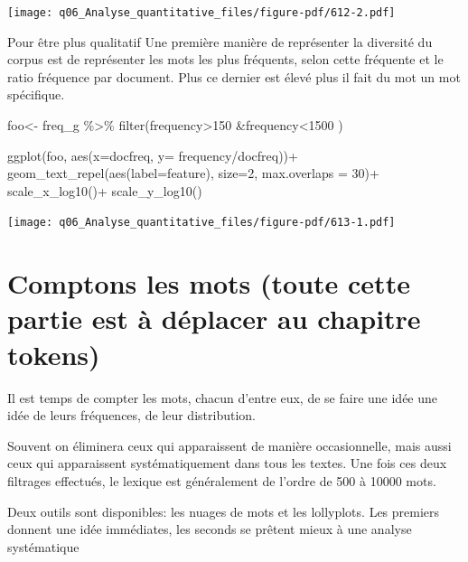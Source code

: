 \documentclass[
  letterpaper,
  DIV=11,
  numbers=noendperiod]{scrreprt}
\newenvironment{Shaded}{\begin{snugshade}}{\end{snugshade}}
\newcommand{\AttributeTok}[1]{\textcolor[rgb]{0.40,0.45,0.13}{#1}}
\newcommand{\DecValTok}[1]{\textcolor[rgb]{0.68,0.00,0.00}{#1}}
\newcommand{\FunctionTok}[1]{\textcolor[rgb]{0.28,0.35,0.67}{#1}}
\newcommand{\NormalTok}[1]{\textcolor[rgb]{0.00,0.23,0.31}{#1}}
\newcommand{\OtherTok}[1]{\textcolor[rgb]{0.00,0.23,0.31}{#1}}
\newcommand{\SpecialCharTok}[1]{\textcolor[rgb]{0.37,0.37,0.37}{#1}}
\begin{document}
\texttt{[image: q06\_Analyse\_quantitative\_files/figure-pdf/612-2.pdf]}

Pour être plus qualitatif Une première manière de représenter la
diversité du corpus est de représenter les mots les plus fréquents,
selon cette fréquente et le ratio fréquence par document. Plus ce
dernier est élevé plus il fait du mot un mot spécifique.

\begin{Shaded}
\begin{Highlighting}[]
\NormalTok{foo}\OtherTok{\textless{}{-}}\NormalTok{ freq\_g }\SpecialCharTok{\%\textgreater{}\%}
  \FunctionTok{filter}\NormalTok{(frequency}\SpecialCharTok{\textgreater{}}\DecValTok{150} \SpecialCharTok{\&}\NormalTok{frequency}\SpecialCharTok{\textless{}}\DecValTok{1500}\NormalTok{ )}

\FunctionTok{ggplot}\NormalTok{(foo, }\FunctionTok{aes}\NormalTok{(}\AttributeTok{x=}\NormalTok{docfreq, }\AttributeTok{y=}\NormalTok{ frequency}\SpecialCharTok{/}\NormalTok{docfreq))}\SpecialCharTok{+}
  \FunctionTok{geom\_text\_repel}\NormalTok{(}\FunctionTok{aes}\NormalTok{(}\AttributeTok{label=}\NormalTok{feature), }\AttributeTok{size=}\DecValTok{2}\NormalTok{, }\AttributeTok{max.overlaps =} \DecValTok{30}\NormalTok{)}\SpecialCharTok{+}
  \FunctionTok{scale\_x\_log10}\NormalTok{()}\SpecialCharTok{+}
  \FunctionTok{scale\_y\_log10}\NormalTok{()}
\end{Highlighting}
\end{Shaded}

\texttt{[image: q06\_Analyse\_quantitative\_files/figure-pdf/613-1.pdf]}

\section{Comptons les mots (toute cette partie est à déplacer au
chapitre
tokens)}\label{comptons-les-mots-toute-cette-partie-est-uxe0-duxe9placer-au-chapitre-tokens}

Il est temps de compter les mots, chacun d'entre eux, de se faire une
idée une idée de leurs fréquences, de leur distribution.

Souvent on éliminera ceux qui apparaissent de manière occasionnelle,
mais aussi ceux qui apparaissent systématiquement dans tous les textes.
Une fois ces deux filtrages effectués, le lexique est généralement de
l'ordre de 500 à 10000 mots.

Deux outils sont disponibles: les nuages de mots et les lollyplots. Les
premiers donnent une idée immédiates, les seconds se prêtent mieux à une
analyse systématique
\end{document}
